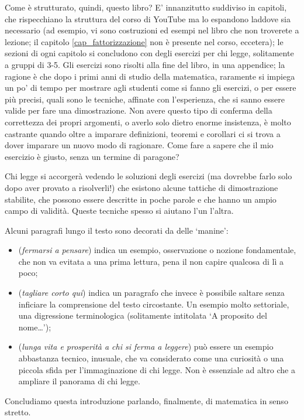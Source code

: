 \medskip
Come è strutturato, quindi, questo libro? E' innanzitutto suddiviso in capitoli, che rispecchiano la struttura del corso di YouTube ma lo espandono laddove sia necessario (ad esempio, vi sono costruzioni ed esempi nel libro che non troverete a lezione; il capitolo \ref{cap_fattorizzazione} non è presente nel corso, eccetera); le sezioni di ogni capitolo si concludono con degli esercizi per chi legge, solitamente a gruppi di 3-5. Gli esercizi sono risolti alla fine del libro, in una appendice; la ragione è che dopo i primi anni di studio della matematica, raramente si impiega un po' di tempo per mostrare agli studenti come si fanno gli esercizi, o per essere più precisi, quali sono le tecniche, affinate con l'esperienza, che si sanno essere valide per fare una dimostrazione. Non avere questo tipo di conferma della correttezza dei propri argomenti, o averlo solo dietro enorme insistenza, è molto castrante quando oltre a imparare definizioni, teoremi e corollari ci si trova a dover imparare un nuovo modo di ragionare. Come fare a sapere che il mio esercizio è giusto, senza un termine di paragone?

Chi legge si accorgerà vedendo le soluzioni degli esercizi (ma dovrebbe farlo solo dopo aver provato a risolverli!) che esistono alcune tattiche di dimostrazione stabilite, che possono essere descritte in poche parole e che hanno un ampio campo di validità. Queste tecniche spesso si aiutano l'un l'altra.

Alcuni paragrafi lungo il testo sono decorati da delle `manine':
\begin{itemize}
	\item {} (\emph{fermarsi a pensare}) indica un esempio, osservazione o nozione fondamentale, che non va evitata a una prima lettura, pena il non capire qualcosa di lì a poco;
	\item {} (\emph{tagliare corto qui}) indica un paragrafo che invece è possibile saltare senza inficiare la comprensione del testo circostante. Un esempio molto settoriale, una digressione terminologica (solitamente intitolata `A proposito del nome\dots');
	\item {} (\emph{lunga vita e prosperità a chi si ferma a leggere}) può essere un esempio abbastanza tecnico, inusuale, che va considerato come una curiosità o una piccola sfida per l'immaginazione di chi legge. Non è essenziale ad altro che a ampliare il panorama di chi legge.
\end{itemize}
\Todo{}
\medskip
Concludiamo questa introduzione parlando, finalmente, di matematica in senso stretto.

